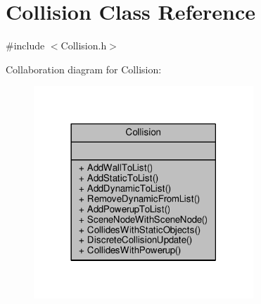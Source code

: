 \hypertarget{class_collision}{\section{Collision Class Reference}
\label{class_collision}
}


{\ttfamily \#include $<$Collision.\-h$>$}



Collaboration diagram for Collision\-:
\nopagebreak
\begin{figure}[H]
\begin{center}
\leavevmode
\includegraphics[width=234pt]{class_collision__coll__graph}
\end{center}
\end{figure}
